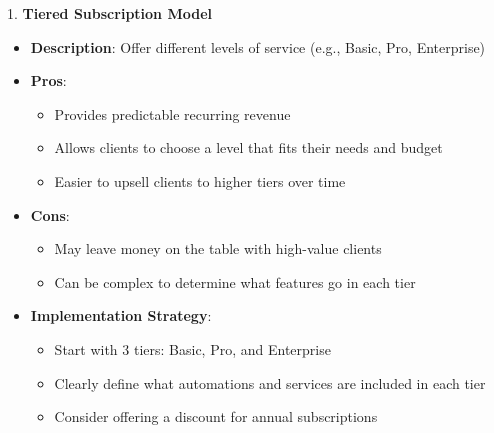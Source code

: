 1. \textbf{Tiered Subscription Model}
   \begin{itemize}
     \item \textbf{Description}: Offer different levels of service (e.g., Basic, Pro, Enterprise)
     \item \textbf{Pros}:
       \begin{itemize}
         \item Provides predictable recurring revenue
         \item Allows clients to choose a level that fits their needs and budget
         \item Easier to upsell clients to higher tiers over time
       \end{itemize}
     \item \textbf{Cons}:
       \begin{itemize}
         \item May leave money on the table with high-value clients
         \item Can be complex to determine what features go in each tier
       \end{itemize}
     \item \textbf{Implementation Strategy}:
       \begin{itemize}
         \item Start with 3 tiers: Basic, Pro, and Enterprise
         \item Clearly define what automations and services are included in each tier
         \item Consider offering a discount for annual subscriptions
       \end{itemize}
   \end{itemize}

